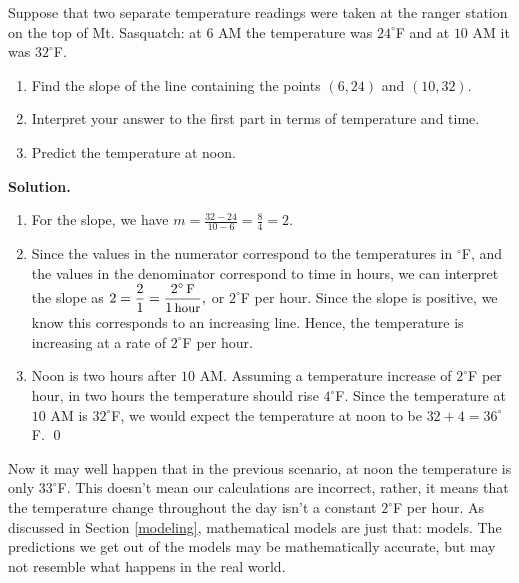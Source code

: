 \begin{ex} Suppose that two separate temperature readings were taken at the ranger station on the top of Mt. Sasquatch: at $6$ AM the temperature was $24^{\circ}$F and  at $10$ AM it was $32^{\circ}$F.  

\begin{enumerate}

\item Find the slope of the line containing the points $(6,24)$ and $(10, 32)$.

\item Interpret your answer to the first part in terms of temperature and time.

\item  Predict the temperature at noon.

\end{enumerate}

\smallskip

{\bf Solution.}  

\begin{enumerate}

\item For the slope, we have  $m = \frac{32 - 24}{10 - 6} = \frac{8}{4} = 2$.  

\item  Since the values in the numerator correspond to the temperatures in $^{\circ}$F, and the values in the denominator correspond to time in hours, we can interpret the slope as $2 = \dfrac{2}{1} = \dfrac{2^{\circ} \, \mbox{\small F}}{1 \, \mbox{\small hour}},$ or $2^{\circ}$F per hour.  Since the slope is positive, we know this corresponds to an increasing line.  Hence, the temperature is increasing at a rate of $2^{\circ}$F per hour.

\item  Noon is two hours after $10$ AM.  Assuming a temperature increase of $2^{\circ}$F per hour, in two hours the temperature should rise $4^{\circ}$F.  Since the temperature at $10$ AM is $32^{\circ}$F, we would expect the temperature at noon to be $32+4=36^{\circ}$F. \qed

\end{enumerate}

\end{ex}

Now it may well happen that in the previous scenario, at noon the temperature is only $33^{\circ}$F.  This doesn't mean our calculations are incorrect, rather, it means that the temperature change throughout the day isn't a constant $2^{\circ}$F per hour. As discussed in Section \ref{modeling}, mathematical models are just that:  models.  The predictions we get out of the models may be mathematically accurate, but may not resemble what happens in the real world. 


